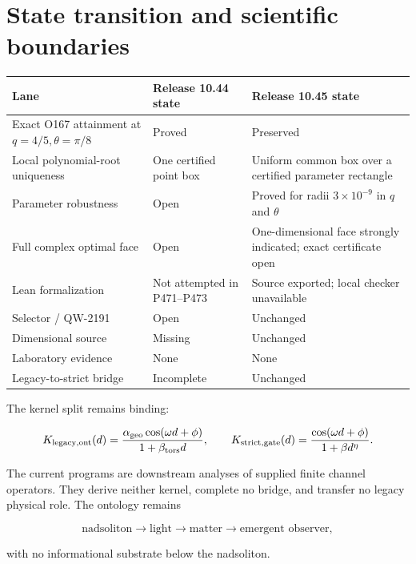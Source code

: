 \documentclass[11pt,a4paper,openany]{report}
\begin{document}
\chapter{State transition and scientific boundaries}

\begin{center}
\begingroup\small
\setlength{\tabcolsep}{2.5pt}
\renewcommand{\arraystretch}{1.16}
\begin{longtable}{@{}p{}p{}p{}@{}}
\toprule
\textbf{Lane} & \textbf{Release 10.44 state} & \textbf{Release 10.45 state} \\
\midrule
\endhead
Exact O167 attainment at \(q=4/5,\theta=\pi/8\) & Proved & Preserved \\
Local polynomial-root uniqueness & One certified point box & Uniform common box over a certified parameter rectangle \\
Parameter robustness & Open & Proved for radii \(3\times10^{-9}\) in \(q\) and \(\theta\) \\
Full complex optimal face & Open & One-dimensional face strongly indicated; exact certificate open \\
Lean formalization & Not attempted in P471--P473 & Source exported; local checker unavailable \\
Selector /\allowbreak{} QW-2191 & Open & Unchanged \\
Dimensional source & Missing & Unchanged \\
Laboratory evidence & None & None \\
Legacy-to-strict bridge & Incomplete & Unchanged \\
\bottomrule
\end{longtable}
\endgroup
\end{center}

The kernel split remains binding:

\[
K_{\rm legacy,ont}(d)=
\frac{\alpha_{\rm geo}\cos(\omega d+\phi)}
{1+\beta_{\rm tors}d},
\qquad
K_{\rm strict,gate}(d)=
\frac{\cos(\omega d+\phi)}{1+\beta d^\eta}.
\]

The current programs are downstream analyses of supplied finite channel operators. They derive neither kernel, complete no bridge, and transfer no legacy physical role. The ontology remains

\[
\text{nadsoliton}\longrightarrow\text{light}\longrightarrow
\text{matter}\longrightarrow\text{emergent observer},
\]

with no informational substrate below the nadsoliton.
\end{document}
